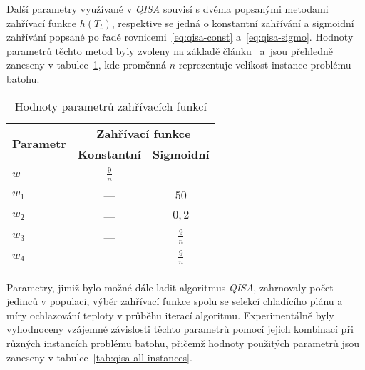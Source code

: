 Další parametry využívané v \emph{QISA} souvisí s dvěma popsanými metodami zahřívací funkce $h\left(T_t\right)$, respektive se jedná o konstantní zahřívání a sigmoidní zahřívání popsané po řadě rovnicemi~\ref{eq:qisa-const} a~\ref{eq:qisa-sigmo}. 
Hodnoty parametrů těchto metod byly zvoleny na základě článku~\cite{qisa} a~jsou přehledně zaneseny v tabulce~\ref{tab:qisa-heating-params}, kde proměnná $n$ reprezentuje velikost instance problému batohu.
\begin{table}[ht]
    \centering
    \begin{tabular}{lcc}
      \toprule
      \multirow{2}{*}{\textbf{Parametr}}  & \multicolumn{2}{c}{\textbf{Zahřívací funkce}} \\
      \cmidrule(lr){2-3}
            & \textbf{Konstantní}  & \textbf{Sigmoidní} \\
      \midrule
      $w$   & $\frac{9}{n}$        & ---                \\[1ex]
      $w_1$ & ---                  & $50$               \\[1ex]
      $w_2$ & ---                  & $0,2$              \\[1ex]
      $w_3$ & ---                  & $\frac{9}{n}$      \\[1ex]
      $w_4$ & ---                  & $\frac{9}{n}$      \\
      \bottomrule
    \end{tabular}
    \caption{Hodnoty parametrů zahřívacích funkcí}
    \label{tab:qisa-heating-params}
\end{table}

Parametry, jimiž bylo možné dále ladit algoritmus \emph{QISA}, zahrnovaly počet jedinců v populaci, výběr zahřívací funkce spolu se selekcí chladícího plánu a míry ochlazování teploty v průběhu iterací algoritmu. 
Experimentálně byly vyhodnoceny vzájemné závislosti těchto parametrů pomocí jejich kombinací při různých instancích problému batohu, přičemž hodnoty použitých parametrů jsou zaneseny v tabulce~\ref{tab:qisa-all-instances}.

